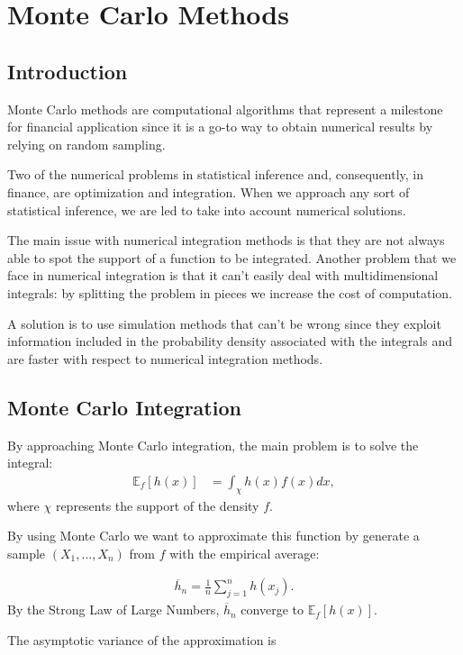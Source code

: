 \documentclass[paper=a4, fontsize=12pt]{scrartcl} %
\numberwithin{equation}{section}
\begin{document}
\section{Monte Carlo Methods}
\subsection{Introduction}
Monte Carlo methods are computational algorithms that represent a milestone for financial application since it is a go-to way to obtain numerical results by relying on random sampling.	\par
Two of the numerical problems in statistical inference and, consequently, in finance, are optimization and integration. When we approach any sort of statistical inference, we are led to take into account numerical solutions.	\par
The main issue with numerical integration methods is that they are not always able to spot the support of a function to be integrated. Another problem that we face in numerical integration is that it can't easily deal with multidimensional integrals: by splitting the problem in pieces we increase the cost of computation.  \par
A solution is to use simulation methods that can't be wrong since they exploit information included in the probability density associated with the integrals and are faster with respect to numerical integration methods.	\par

\subsection{Monte Carlo Integration}
By approaching Monte Carlo integration, the main problem is to solve the integral:
	\begin{equation}	\label{eq:1}
	\begin{aligned}
		\mathbb{E}_f[h(x)] &= \int_\chi h(x)f(x)dx,
	\end{aligned}
	\end{equation}
where $\chi$ represents the support of the density $f$. \par
By using Monte Carlo we want to approximate this function by generate a sample $(X_1, ..., X_n)$ from $f$ with the empirical average:

	\begin{equation}	
	\begin{aligned}
		\overline{h}_n = \frac{1}{n} \sum_{j=1}^{n} h(x_j).
	\end{aligned}
	\end{equation}
By the Strong Law of Large Numbers, $\overline{h}_n$ converge to $\mathbb{E}_f[h(x)]$. \par
The asymptotic variance of the approximation is
\end{document}
